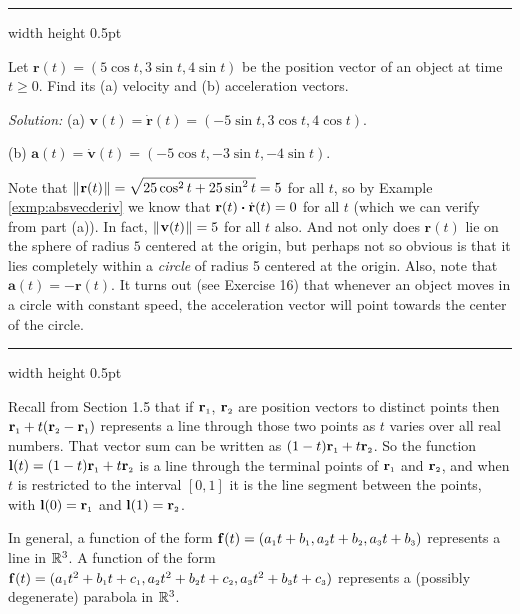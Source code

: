 \smallskip
\hrule width \textwidth height 0.5pt
\begin{exmp}
 Let $\mathbf{r}(t) = (5 \cos t , 3 \sin t , 4 \sin t )$ be the position vector of an object at time $t \ge 0$. Find
 its (a) velocity and (b) acceleration vectors.
 \smallskip
 \par\noindent \emph{Solution:} (a) $\mathbf{v}(t) = \dot{\mathbf{r}}(t) = (-5 \sin t , 3 \cos t ,
 4 \cos t )$.
 \smallskip
 \par\noindent (b) $\mathbf{a}(t) = \dot{\mathbf{v}}(t) = (-5 \cos t , -3 \sin t , -4 \sin t )$.
 \smallskip
 
 \par\noindent Note that $\lVert\mspace{1mu}\mathbf{r}(t)\mspace{1mu}\rVert = \sqrt{25 \cos^2 t + 25 \sin^2 t} = 5$ for all $t$, so by Example
 \ref{exmp:absvecderiv} we know that $\mathbf{r}(t) \bm{\cdot} \dot{\mathbf{r}}(t) = 0$ for all $t$ (which we can verify
 from part (a)). In fact, $\lVert\mspace{1mu}\mathbf{v}(t)\mspace{1mu}\rVert = 5$ for all $t$ also. And not only does $\mathbf{r}(t)$ lie on the
 sphere of radius $5$ centered at the origin, but perhaps not so obvious is that it lies completely within a
 \emph{circle} of radius 5 centered at the origin. Also, note that $\mathbf{a}(t) = -\mathbf{r}(t)$. It turns out (see
 Exercise 16) that whenever an object moves in a circle with constant speed, the acceleration vector will point towards the center of the circle.
\end{exmp}
\hrule width \textwidth height 0.5pt
\vskip3mm

Recall from Section 1.5 that if $\mathbf{r}_{\scriptscriptstyle 1}$, $\mathbf{r}_{\scriptscriptstyle 2}$ are position vectors to distinct points
then $\mathbf{r}_{\scriptscriptstyle 1} + t (\mathbf{r}_{\scriptscriptstyle 2} - \mathbf{r}_{\scriptscriptstyle 1})$ represents a line through those two
points as $t$ varies over all real numbers. That vector sum can be written as $(1 - t) \mathbf{r}_{\scriptscriptstyle 1} +
t \mathbf{r}_{\scriptscriptstyle 2}$. So the function $\mathbf{l}(t) = (1 - t) \mathbf{r}_{\scriptscriptstyle 1} +
t \mathbf{r}_{\scriptscriptstyle 2}$ is a line through the terminal points of $\mathbf{r}_{\scriptscriptstyle 1}$ and $\mathbf{r}_{\scriptscriptstyle 2}$, and
when $t$ is restricted to the interval $\left[ 0,1 \right]$ it is the line segment between the points, with
$\mathbf{l}(0) = \mathbf{r}_{\scriptscriptstyle 1}$ and $\mathbf{l}(1) = \mathbf{r}_{\scriptscriptstyle 2}$.

In general, a function of the form
$\mathbf{f}(t) = (a_{\scriptscriptstyle 1}t + b_{\scriptscriptstyle 1},a_{\scriptscriptstyle 2}t + b_{\scriptscriptstyle 2},a_{\scriptscriptstyle 3}t + b_{\scriptscriptstyle 3})$ represents a line
in $\mathbb{R}^{3}$. A function of the form
$\mathbf{f}(t) = (a_{\scriptscriptstyle 1}t^2 + b_{\scriptscriptstyle 1}t + c_{\scriptscriptstyle 1},a_{\scriptscriptstyle 2}t^2 + b_{\scriptscriptstyle 2}t + c_{\scriptscriptstyle 2},
a_{\scriptscriptstyle 3}t^2 + b_{\scriptscriptstyle 3}t + c_{\scriptscriptstyle 3})$ represents a (possibly degenerate) parabola in $\mathbb{R}^{3}$.

